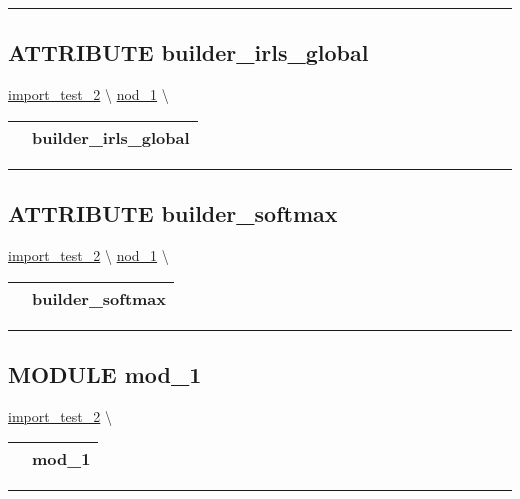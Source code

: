\par


\rule{\linewidth}{0.5pt}
\subsection*{\textsf{\colorbox{headtoc}{\color{white} ATTRIBUTE}
builder\_irls\_global}}

\hypertarget{ecldoc:constants.builder_irls_global}{}
\hspace{0pt} \hyperlink{ecldoc:import_test_2}{import_test_2} \textbackslash 
\hspace{0pt} \hyperlink{ecldoc:Constants}{nod_1} \textbackslash 

{\renewcommand{\arraystretch}{1.5}
\begin{tabularx}{\textwidth}{|>{\raggedright\arraybackslash}l|X|}
\hline
\hspace{0pt}\mytexttt{\color{red} } & \textbf{builder\_irls\_global} \\
\hline
\end{tabularx}
}

\par


\rule{\linewidth}{0.5pt}
\subsection*{\textsf{\colorbox{headtoc}{\color{white} ATTRIBUTE}
builder\_softmax}}

\hypertarget{ecldoc:constants.builder_softmax}{}
\hspace{0pt} \hyperlink{ecldoc:import_test_2}{import_test_2} \textbackslash 
\hspace{0pt} \hyperlink{ecldoc:Constants}{nod_1} \textbackslash 

{\renewcommand{\arraystretch}{1.5}
\begin{tabularx}{\textwidth}{|>{\raggedright\arraybackslash}l|X|}
\hline
\hspace{0pt}\mytexttt{\color{red} } & \textbf{builder\_softmax} \\
\hline
\end{tabularx}
}

\par


\rule{\linewidth}{0.5pt}


\subsection*{\textsf{\colorbox{headtoc}{\color{white} MODULE}
mod\_1}}

\hypertarget{ecldoc:PBblas}{}
\hspace{0pt} \hyperlink{ecldoc:import_test_2}{import_test_2} \textbackslash 

{\renewcommand{\arraystretch}{1.5}
\begin{tabularx}{\textwidth}{|>{\raggedright\arraybackslash}l|X|}
\hline
\hspace{0pt}\mytexttt{\color{red} } & \textbf{mod\_1} \\
\hline
\end{tabularx}
}

\par


\rule{\linewidth}{0.5pt}


